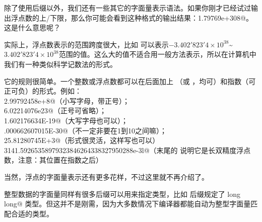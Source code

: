 除了使用后缀以外，我们还有一些其它的字面量表示语法。如果你刚才已经试过输出浮点数的上/下限，那么你可能会看到这种格式的输出结果：\lstinline@1.79769e+308@。这是什么意思呢？\par
实际上，浮点数表示的范围跨度很大，比如 \lstinline@float@ 可以表示$-3.402'823'4\times10^{38}$\~{}$3.402'823'4\times10^{38}$范围的值。这么大的值不适合用一般方法表示，所以在计算机中我们有一种类似科学记数法的形式。\par
它的规则很简单。一个整数或浮点数都可以在后面加上 \lstinline@e@（或 \lstinline@E@，均可）和指数（可正可负）的形式。例如：\\
\lstinline@2.99792458e+8@（小写字母，带正号）；\\
\lstinline@6.02214076e23@（正号可省略）；\\
\lstinline@1.602176634E-19@（大写字母也可以）；\\
\lstinline@.000662607015E-30@（不一定非要在1到10之间嘛）；\\
\lstinline@25.81280745E+3@（形式很灵活，这样写也可以）\\
\lstinline@3141.59265358979323846264338327950288e-3l@（末尾的 \lstinline@l@ 说明它是长双精度浮点数，注意：其位置在指数之后）\par
当然，浮点的字面量表示还有更多花样，不过这里就不再介绍了。\par
整型数据的字面量同样有很多后缀可以用来指定类型，比如 \lstinline@ull@ 后缀规定了 \lstinline@unsigned long long@ 类型。但这并不是刚需，因为大多数情况下编译器都能自动为整型字面量匹配合适的类型。\par
